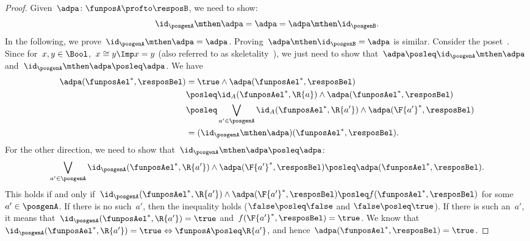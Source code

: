 \begin{proof}
    Given~$\adpa\colon \funposA\profto \resposB$, we need to show:
    \begin{equation*}
        \id_\posgenA \mthen \adpa= \adpa = \adpa\mthen \id_\posgenB.
    \end{equation*}
    In the following, we prove~$\id_\posgenA \mthen \adpa = \adpa$.
    Proving~$\adpa\mthen \id_\posgenB=\adpa$ is similar.
    Consider the poset~\Bool. Since for~$x,y\in \Bool$,~$x\cong y \Imp x=y$ (also referred to as skeletality~\cite{fong2019}), we just need to show that~$\adpa\posleq \id_\posgenA\mthen \adpa$ and~$\id_\posgenA\mthen \adpa\posleq \adpa$.
    We have
    \begin{equation*}
        \label{eq:dp_unit_1}
        \begin{aligned}
            \adpa(\funposAel^*,\resposBel)&=\true \wedge \adpa(\funposAel^*,\resposBel)\\
            &\posleq \id_A(\funposAel^*,\R{a}) \wedge \adpa(\funposAel^*,\resposBel)\\
            &\posleq \bigvee_{a'\in \posgenA}\id_A(\funposAel^*,\R{a'})\wedge \adpa(\F{a'}^*,\resposBel)\\
            &=(\id_\posgenA\mthen \adpa)(\funposAel^*,\resposBel).
        \end{aligned}
    \end{equation*}
    For the other direction, we need to show that~$\id_\posgenA\mthen \adpa\posleq \adpa$:
    \begin{equation*}
        \label{eq:dp_unit_2}
        \bigvee_{a'\in \posgenA}\id_\posgenA(\funposAel^*,\R{a'})\wedge \adpa(\F{a'}^*,\resposBel) \posleq \adpa(\funposAel^*,\resposBel).
    \end{equation*}
    This holds if and only if~$\id_\posgenA(\funposAel^*,\R{a'})\wedge \adpa(\F{a'}^*,\resposBel) \posleq f(\funposAel^*,\resposBel)$ for some~$a'\in \posgenA$.
    If there is no such~$a'$, then the inequality holds ($\false \posleq \false$ and $\false \posleq \true$).
    If there is such an~$a'$, it means that~$\id_\posgenA(\funposAel^*,\R{a'})=\true$ and~$f(\F{a'}^*,\resposBel)=\true$.
    We know that~$\id_\posgenA(\funposAel^*,\R{a'})=\true \Leftrightarrow \funposA\posleq \R{a'}$, and hence~$\adpa(\funposAel^*,\resposBel)=\true$.
\end{proof}
